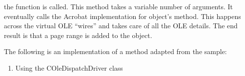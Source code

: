\documentclass[letterpaper,12pt,english,openany,oneside]{sphinxmanual}
\begin{document}
\begin{sphinxVerbatim}[commandchars=\\\{\}]
 
\end{sphinxVerbatim}

the  function is called. This  method takes a variable number of arguments. It eventually calls the Acrobat implementation for  object’s  method. This happens across the virtual OLE “wires” and takes care of all the OLE details. The end result is that a page range is added to the  object.

The following is an implementation of a method adapted from the  sample:
\begin{enumerate}
%
\item {} 
Using the COleDispatchDriver class

\end{enumerate}
\end{document}

